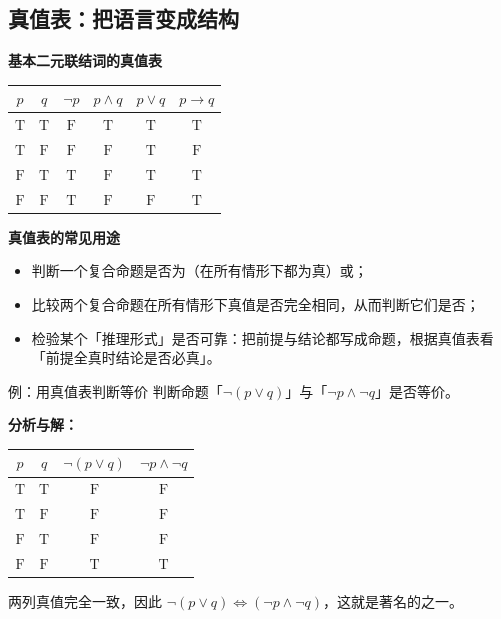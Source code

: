 \documentclass[a4paper,11pt]{ctexart}
\newcommand{\LogicMiniHeading}[1]{%
  \par\smallskip
  \noindent\textbf{#1}\par\smallskip
}
\begin{document}
\clearpage
\subsection{真值表：把语言变成结构}

\LogicMiniHeading{基本二元联结词的真值表}

\begin{center}
\begin{tabular}{cc|c c c c}
  \toprule
  $p$ & $q$ & $\neg p$ & $p\land q$ & $p\lor q$ & $p\to q$ \\
  \midrule
  $\mathrm{T}$ & $\mathrm{T}$ & $\mathrm{F}$ & $\mathrm{T}$ & $\mathrm{T}$ & $\mathrm{T}$ \\
  $\mathrm{T}$ & $\mathrm{F}$ & $\mathrm{F}$ & $\mathrm{F}$ & $\mathrm{T}$ & $\mathrm{F}$ \\
  $\mathrm{F}$ & $\mathrm{T}$ & $\mathrm{T}$ & $\mathrm{F}$ & $\mathrm{T}$ & $\mathrm{T}$ \\
  $\mathrm{F}$ & $\mathrm{F}$ & $\mathrm{T}$ & $\mathrm{F}$ & $\mathrm{F}$ & $\mathrm{T}$ \\
  \bottomrule
\end{tabular}
\end{center}

\LogicMiniHeading{真值表的常见用途}

\begin{itemize}
  \item 判断一个复合命题是否为（在所有情形下都为真）或；
  \item 比较两个复合命题在所有情形下真值是否完全相同，从而判断它们是否；
  \item 检验某个「推理形式」是否可靠：把前提与结论都写成命题，根据真值表看「前提全真时结论是否必真」。
\end{itemize}

\begin{examplebox}{例：用真值表判断等价}
  判断命题「$\neg(p\lor q)$」与「$\neg p\land\neg q$」是否等价。

  \textbf{分析与解：}
  \begin{center}
  \begin{tabular}{cc|c c}
    \toprule
    $p$ & $q$ & $\neg(p\lor q)$ & $\neg p\land\neg q$ \\
    \midrule
    $\mathrm{T}$ & $\mathrm{T}$ & $\mathrm{F}$ & $\mathrm{F}$ \\
    $\mathrm{T}$ & $\mathrm{F}$ & $\mathrm{F}$ & $\mathrm{F}$ \\
    $\mathrm{F}$ & $\mathrm{T}$ & $\mathrm{F}$ & $\mathrm{F}$ \\
    $\mathrm{F}$ & $\mathrm{F}$ & $\mathrm{T}$ & $\mathrm{T}$ \\
    \bottomrule
  \end{tabular}
  \end{center}
  两列真值完全一致，因此 $\neg(p\lor q)\iff(\neg p\land\neg q)$，这就是著名的之一。
\end{examplebox}
\end{document}
